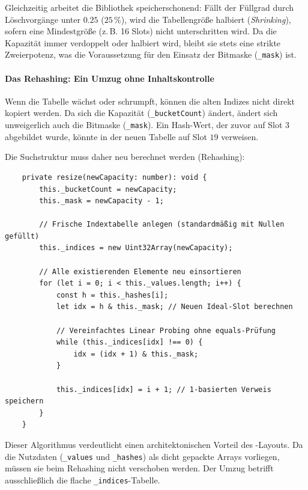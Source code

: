 Gleichzeitig arbeitet die Bibliothek speicherschonend: Fällt der Füllgrad durch Löschvorgänge unter $0.25$ ($25\,\%$), wird die Tabellengröße halbiert (\textit{Shrinking}), sofern eine Mindestgröße (z.\,B. 16 Slots) nicht unterschritten wird. Da die Kapazität immer verdoppelt oder halbiert wird, bleibt sie stets eine strikte Zweierpotenz, was die Voraussetzung für den Einsatz der Bitmaske (\texttt{_mask}) ist.

\paragraph*{Das Rehashing: Ein Umzug ohne Inhaltskontrolle}
Wenn die Tabelle wächst oder schrumpft, können die alten Indizes nicht direkt kopiert werden. Da sich die Kapazität (\texttt{_bucketCount}) ändert, ändert sich unweigerlich auch die Bitmaske (\texttt{_mask}). Ein Hash-Wert, der zuvor auf Slot $3$ abgebildet wurde, könnte in der neuen Tabelle auf Slot $19$ verweisen. 

Die Suchstruktur muss daher neu berechnet werden (Rehashing):

\begin{listing}[ht]
    \caption{Der Rehashing-Prozess bei einer Kapazitätsänderung}
    \label{lst:rs-rehashing}
    \begin{verbatim}
    private resize(newCapacity: number): void {
        this._bucketCount = newCapacity;
        this._mask = newCapacity - 1;
        
        // Frische Indextabelle anlegen (standardmäßig mit Nullen gefüllt)
        this._indices = new Uint32Array(newCapacity);

        // Alle existierenden Elemente neu einsortieren
        for (let i = 0; i < this._values.length; i++) {
            const h = this._hashes[i];
            let idx = h & this._mask; // Neuen Ideal-Slot berechnen

            // Vereinfachtes Linear Probing ohne equals-Prüfung
            while (this._indices[idx] !== 0) {
                idx = (idx + 1) & this._mask; 
            }
            
            this._indices[idx] = i + 1; // 1-basierten Verweis speichern
        }
    }
    \end{verbatim}
\end{listing}

Dieser Algorithmus verdeutlicht einen architektonischen Vorteil des -Lay\-outs. Da die Nutzdaten (\texttt{_values} und \texttt{_hashes}) als dicht gepackte Arrays vorliegen, müssen sie beim Rehashing nicht verschoben werden. Der Umzug betrifft ausschließlich die flache \texttt{_indices}-Tabelle.

